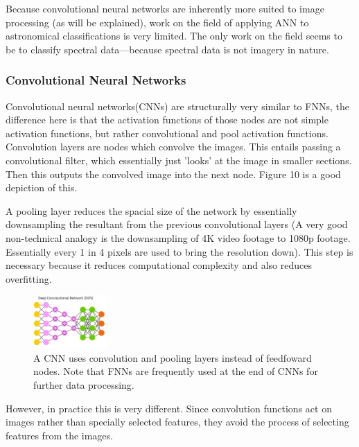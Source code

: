 \documentclass[a4paper,11pt]{article}
\begin{document}
Because convolutional neural networks  are inherently more suited to image processing (as will be explained), work on the field of applying ANN to astronomical classifications is very limited. The only work on the field seems to be to classify spectral data—because spectral data is not imagery in nature.\cite{hampton_2017_using} 

\subsubsection{Convolutional Neural Networks}
Convolutional neural networks(CNNs) are structurally very similar to FNNs, the difference here is that the activation functions of those nodes are not simple activation functions, but rather convolutional and pool activation functions. Convolution layers are nodes which convolve the images. This entails passing a convolutional filter, which essentially just 'looks' at the image in smaller sections. Then this outputs the convolved image into the next node. Figure 10 is a good depiction of this. 

A pooling layer reduces the spacial size of the network by essentially downsampling the resultant from the previous convolutional layers (A very good non-technical analogy is the downsampling of 4K video footage to 1080p footage. Essentially every 1 in 4 pixels are used to bring the resolution down). This step is necessary because it reduces computational complexity and also reduces overfitting.
\begin{figure}[ht]
\centering
\includegraphics[width=0.25\textwidth]{CNN.png}
\caption{\label{fig:CNN}A CNN uses convolution and pooling layers instead of feedfoward nodes. Note that FNNs are frequently used at the end of CNNs for further data processing.\cite{tch_2017_the}}
\end{figure}

However, in practice this is very different. Since convolution functions act on images rather than specially selected features, they avoid the process of selecting features from the images.
\end{document}
